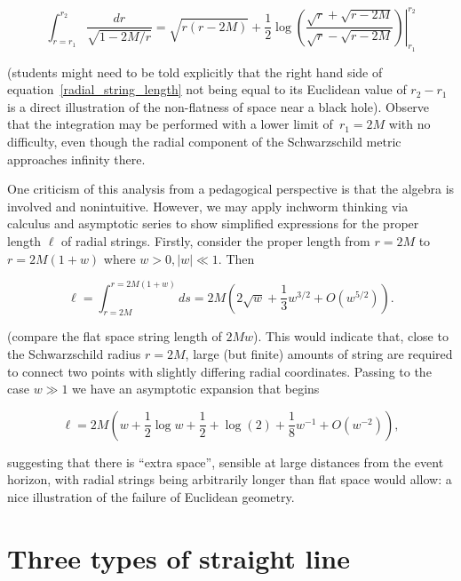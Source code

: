 \documentclass[review]{elsarticle}
\begin{document}
\begin{equation}\label{radial_string_length}
  \int_{r=r_1}^{r_2}\frac{dr}{\sqrt{1-2M/r}}=
  \left.
  \sqrt{r(r-2M)} +\frac{1}{2}\log\left(
  \frac{\sqrt{r}+\sqrt{r-2M}}{\sqrt{r}-\sqrt{r-2M}}\right)
  \right|_{r_1}^{r_2}
  \end{equation}

(students might need to be told explicitly that the right hand side of
equation~\ref{radial_string_length} not being equal to its Euclidean
value of $r_2-r_1$ is a direct illustration of the non-flatness of
space near a black hole).  Observe that the integration may be
performed with a lower limit of~$r_1=2M$ with no difficulty, even
though the radial component of the Schwarzschild metric approaches
infinity there.

One criticism of this analysis from a pedagogical perspective is that
the algebra is involved and nonintuitive.  However, we may apply
inchworm thinking via calculus and asymptotic series to show
simplified expressions for the proper length $\ell$ of radial strings.
Firstly, consider the proper length from $r=2M$ to $r=2M(1+w)$ where
$w>0, \left|w\right|\ll 1$.  Then

 \begin{equation}\label{ell}
   \ell =
   \int_{r=2M}^{r=2M(1+w)}ds
   =2M\left(2\sqrt{w} + \frac{1}{3}w^{3/2} + O(w^{5/2})\right).
 \end{equation}

(compare the flat space string length of $2Mw$).  This would indicate
 that, close to the Schwarzschild radius $r=2M$, large (but finite)
 amounts of string are required to connect two points with slightly
 differing radial coordinates.  Passing to the case $w\gg 1$ we have
 an asymptotic expansion that begins


\begin{equation}\label{asymptotic_ell}
  \ell = 2M\left(w +  \frac{1}{2}\log w + \frac{1}{2} + \log(2)  +  \frac{1}{8}w^{-1} + O(w^{-2})\right),
\end{equation}

\noindent suggesting that there is ``extra space'', sensible at large
distances from the event horizon, with radial strings being
arbitrarily longer than flat space would allow: a nice illustration of
the failure of Euclidean geometry.

\section{Three types of straight line}
\end{document}
